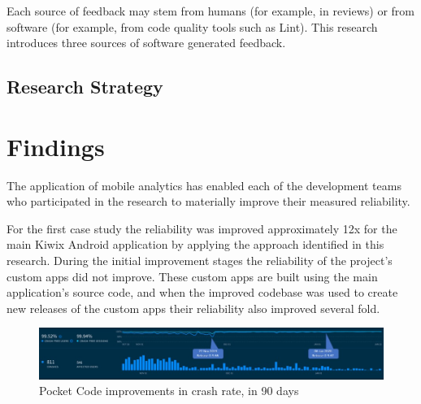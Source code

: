 Each source of feedback may stem from humans (for example, in reviews) or from software (for example, from code quality tools such as Lint). This research introduces three sources of software generated feedback.

\subsection{Research Strategy}


\section{Findings}\label{findings-section}

The application of mobile analytics has enabled each of the development teams who participated in the research to materially improve their measured reliability. 

For the first case study the reliability was improved approximately 12x for the main Kiwix Android application by applying the approach identified in this research. 
During the initial improvement stages the reliability of the project's custom apps did not improve. These custom apps are built using the main application's source code, and when the improved codebase was used to create new releases of the custom apps their reliability also improved several fold.

\begin{figure}[htbp!]
    \centering
    \includegraphics[width=\textwidth]{images/annotated_pocketcode_90_day_fabric_crashlytics_report.jpg}
    \caption{Pocket Code improvements in crash rate, in 90 days}
    \label{fig:pocketcode_improvements_in_crash_rate}
\end{figure}

